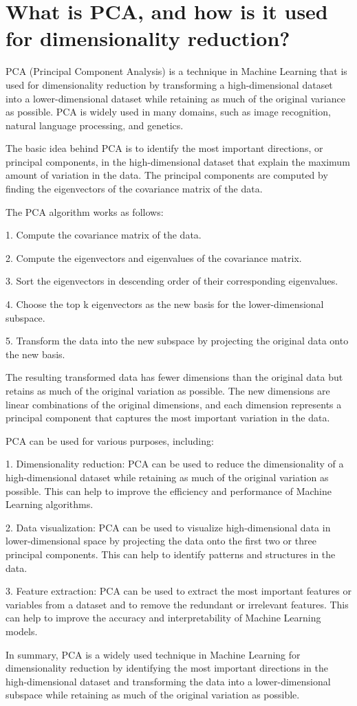 \section{What is PCA, and how is it used for dimensionality reduction?}
PCA (Principal Component Analysis) is a technique in Machine Learning that is used for dimensionality reduction by transforming a high-dimensional dataset into a lower-dimensional dataset while retaining as much of the original variance as possible. PCA is widely used in many domains, such as image recognition, natural language processing, and genetics.

The basic idea behind PCA is to identify the most important directions, or principal components, in the high-dimensional dataset that explain the maximum amount of variation in the data. The principal components are computed by finding the eigenvectors of the covariance matrix of the data.

The PCA algorithm works as follows:

1. Compute the covariance matrix of the data.

2. Compute the eigenvectors and eigenvalues of the covariance matrix.

3. Sort the eigenvectors in descending order of their corresponding eigenvalues.

4. Choose the top k eigenvectors as the new basis for the lower-dimensional subspace.

5. Transform the data into the new subspace by projecting the original data onto the new basis.

The resulting transformed data has fewer dimensions than the original data but retains as much of the original variation as possible. The new dimensions are linear combinations of the original dimensions, and each dimension represents a principal component that captures the most important variation in the data.

PCA can be used for various purposes, including:

1. Dimensionality reduction: PCA can be used to reduce the dimensionality of a high-dimensional dataset while retaining as much of the original variation as possible. This can help to improve the efficiency and performance of Machine Learning algorithms.

2. Data visualization: PCA can be used to visualize high-dimensional data in lower-dimensional space by projecting the data onto the first two or three principal components. This can help to identify patterns and structures in the data.

3. Feature extraction: PCA can be used to extract the most important features or variables from a dataset and to remove the redundant or irrelevant features. This can help to improve the accuracy and interpretability of Machine Learning models.

In summary, PCA is a widely used technique in Machine Learning for dimensionality reduction by identifying the most important directions in the high-dimensional dataset and transforming the data into a lower-dimensional subspace while retaining as much of the original variation as possible.

